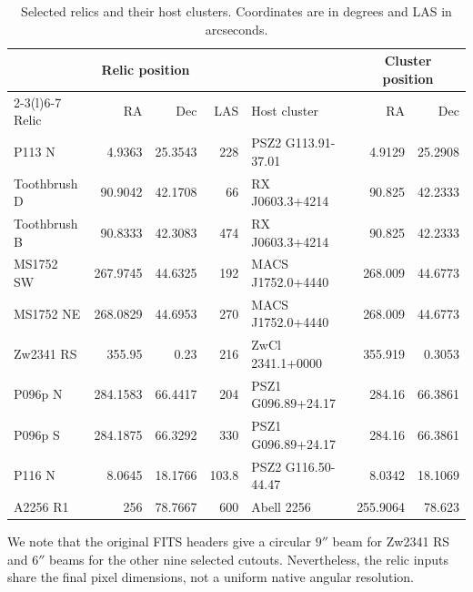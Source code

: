 \begin{table}[H]
\centering
\small
\setlength{\tabcolsep}{3pt}
\renewcommand{\arraystretch}{1.1}
\begin{tabular}{@{}lrrrlrr@{}}
\toprule
 & \multicolumn{2}{c}{Relic position} & & & \multicolumn{2}{c}{Cluster position} \\
\cmidrule(lr){2-3}\cmidrule(l){6-7}
Relic & RA & Dec & LAS & Host cluster & RA & Dec \\
\midrule
P113 N      & 4.9363 & 25.3543 & 228 & PSZ2 G113.91-37.01 & 4.9129 & 25.2908 \\
Toothbrush D & 90.9042 & 42.1708 & 66 & RX J0603.3+4214 & 90.825 & 42.2333 \\
Toothbrush B & 90.8333 & 42.3083 & 474 & RX J0603.3+4214 & 90.825 & 42.2333 \\
MS1752 SW   & 267.9745 & 44.6325 & 192 & MACS J1752.0+4440 & 268.009 & 44.6773 \\
MS1752 NE   & 268.0829 & 44.6953 & 270 & MACS J1752.0+4440 & 268.009 & 44.6773 \\
Zw2341 RS   & 355.95 & 0.23 & 216 & ZwCl 2341.1+0000 & 355.919 & 0.3053 \\
P096p N     & 284.1583 & 66.4417 & 204 & PSZ1 G096.89+24.17 & 284.16 & 66.3861 \\
P096p S     & 284.1875 & 66.3292 & 330 & PSZ1 G096.89+24.17 & 284.16 & 66.3861 \\
P116 N      & 8.0645 & 18.1766 & 103.8 & PSZ2 G116.50-44.47 & 8.0342 & 18.1069 \\
A2256 R1    & 256 & 78.7667 & 600 & Abell 2256 & 255.9064 & 78.623 \\
\bottomrule
\end{tabular}
\caption[Selected radio relics and host clusters]{Selected relics and their host clusters. Coordinates are in degrees and LAS in arcseconds.}
\label{tab:relic_sample}
\end{table}

We note that the original FITS headers give a circular \(9''\) beam for Zw2341 RS and \(6''\) beams for the other nine selected cutouts. Nevertheless, the relic inputs share the final pixel dimensions, not a uniform native angular resolution.
